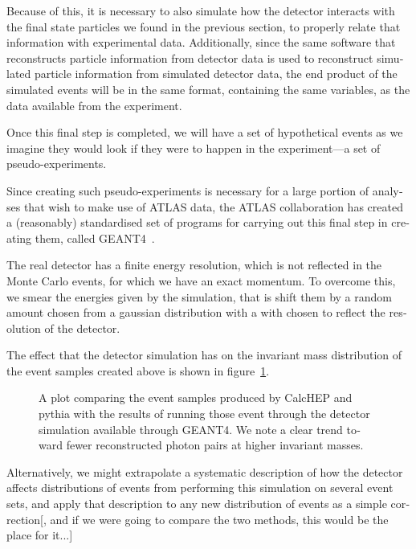 \begin{english}
Because of this, it is necessary to also simulate how the detector interacts with the final state particles we found in the previous section, to properly relate that information with experimental data. Additionally, since the same software that reconstructs particle information from detector data is used to reconstruct simulated particle information from simulated detector data, the end product of the simulated events will be in the same format, containing the same variables, as the data available from the experiment.

Once this final step is completed, we will have a set of hypothetical events as we imagine they would look if they were to happen in the experiment---a set of pseudo-experiments.

Since creating such pseudo-experiments is necessary for a large portion of analyses that wish to make use of ATLAS data, the ATLAS collaboration has created a (reasonably) standardised set of programs for carrying out this final step in creating them, called GEANT4~\cite{geant4}.

The real detector has a finite energy resolution, which is not reflected in the Monte Carlo events, for which we have an exact momentum. To overcome this, we smear the energies given by the simulation, that is shift them by a random amount chosen from a gaussian distribution with a with chosen to reflect the resolution of the detector.

The effect that the detector simulation has on the invariant mass distribution of the event samples created above is shown in figure~\ref{geant-beaf}.

\begin{figure}[hbt]
\begin{minipage}[b]{.69\textwidth}
\begin{infilsf} \tiny

\end{infilsf}
\end{minipage}
\hfill\begin{minipage}[b]{.3\textwidth}
\caption{A plot comparing the event samples produced by CalcHEP and pythia with the results of running those event through the detector simulation available through GEANT4. We note a clear trend toward fewer reconstructed photon pairs at higher invariant masses. \label{geant-beaf}}
\end{minipage}
\end{figure}

Alternatively, we might extrapolate a systematic description of how the detector affects distributions of events from performing this simulation on several event sets, and apply that description to any new distribution of events as a simple correction[, and if we were going to compare the two methods, this would be the place for it...]


\end{english}
